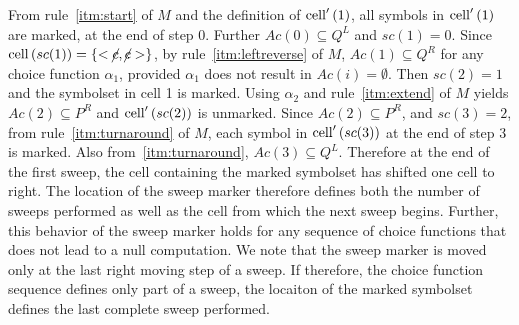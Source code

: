 From rule~\ref{itm:start} of $M$ and the definition of $\mathrm{cell}'\left(1\right)$, all
symbols in $\mathrm{cell}'\left(1\right)$ are marked, at the end of step 0.
Further $Ac(0) \subseteq Q^L$ and $sc(1) = 0$.
Since $\mathrm{cell}\left(sc(1)\right) = \{<\cancel{c}, \cancel{c}>\}$, by rule~\ref{itm:leftreverse}
of $M$, $Ac(1) \subseteq Q^R$ for any choice function $\alpha_1$, provided
$\alpha_1$ does not result in $Ac(i) = \emptyset$.
Then $sc(2) = 1$ and the symbolset in cell 1 is marked.  Using $\alpha_2$
and rule~\ref{itm:extend} of $M$ yields $Ac(2) \subseteq P^R$ and
$\mathrm{cell}'\left(sc(2)\right)$ is unmarked.
Since $Ac(2) \subseteq P^R$, and $sc(3) = 2$, from rule~\ref{itm:turnaround}
of $M$, each symbol in $\mathrm{cell}'\left(sc(3)\right)$ at the end of step 3 is marked.
Also from~\ref{itm:turnaround}, $Ac(3) \subseteq Q^L$.
Therefore at the end of the first sweep, the cell containing the
marked symbolset has shifted one cell to right.
The location of the sweep marker therefore defines both the number of
sweeps performed as well as the cell from which the next sweep begins.
Further, this behavior of the sweep marker holds for any sequence of choice
functions that does not lead to a null computation.
We note that the sweep marker is moved only at the last right moving
step of a sweep.
If therefore, the choice function sequence defines only part of a sweep,
the locaiton of the marked symbolset defines the last complete sweep performed.

